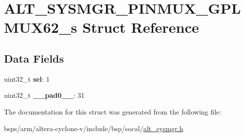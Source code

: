 \hypertarget{structALT__SYSMGR__PINMUX__GPLMUX62__s}{}\section{A\+L\+T\+\_\+\+S\+Y\+S\+M\+G\+R\+\_\+\+P\+I\+N\+M\+U\+X\+\_\+\+G\+P\+L\+M\+U\+X62\+\_\+s Struct Reference}
\label{structALT__SYSMGR__PINMUX__GPLMUX62__s}
\subsection*{Data Fields}
\begin{DoxyCompactItemize}
\item 
\mbox{\label{structALT__SYSMGR__PINMUX__GPLMUX62__s_a3173a391a13e67786140433393334e8b}} 
uint32\+\_\+t {\bfseries sel}\+: 1
\item 
\mbox{\label{structALT__SYSMGR__PINMUX__GPLMUX62__s_a1cd489b6bdc4e93023c494c90ace79f3}} 
uint32\+\_\+t {\bfseries \+\_\+\+\_\+pad0\+\_\+\+\_\+}\+: 31
\end{DoxyCompactItemize}


The documentation for this struct was generated from the following file\+:\begin{DoxyCompactItemize}
\item 
bsps/arm/altera-\/cyclone-\/v/include/bsp/socal/\mbox{\hyperlink{alt__sysmgr_8h}{alt\+\_\+sysmgr.\+h}}\end{DoxyCompactItemize}
